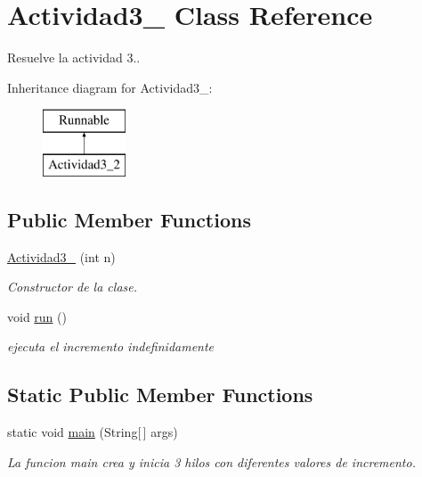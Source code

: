 \hypertarget{classActividad3__2}{\section{Actividad3\-\_ Class Reference}
\label{classActividad3__2}
}


Resuelve la actividad 3..  


Inheritance diagram for Actividad3\-\_\-:\begin{figure}[H]
\begin{center}
\leavevmode
\includegraphics[height=2.000000cm]{classActividad3__2}
\end{center}
\end{figure}
\subsection*{Public Member Functions}
\begin{DoxyCompactItemize}
\item 
\hyperlink{classActividad3__2_a765178bf74270a5de1e36cfa9ae5d122}{Actividad3\-\_} (int n)
\begin{DoxyCompactList}\small\item\em Constructor de la clase. \end{DoxyCompactList}\item 
void \hyperlink{classActividad3__2_abbd52976157c9a88e6308b9b336afd3d}{run} ()
\begin{DoxyCompactList}\small\item\em ejecuta el incremento indefinidamente \end{DoxyCompactList}\end{DoxyCompactItemize}
\subsection*{Static Public Member Functions}
\begin{DoxyCompactItemize}
\item 
static void \hyperlink{classActividad3__2_a1cde3718f03eb51c4a1180742170439f}{main} (String\mbox{[}$\,$\mbox{]} args)
\begin{DoxyCompactList}\small\item\em La funcion main crea y inicia 3 hilos con diferentes valores de incremento. \end{DoxyCompactList}\end{DoxyCompactItemize}


